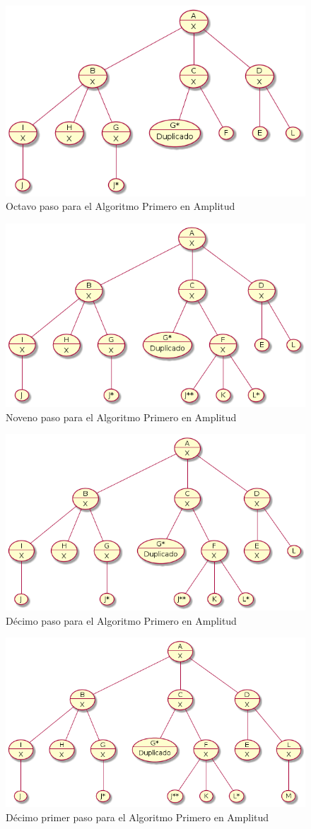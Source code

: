 \documentclass{article}
\begin{document}
\begin{figure}[H]
  \centering
  \includegraphics[width=.4\linewidth]{EJ4/ej4_007.png}
  \caption{Octavo paso para el Algoritmo Primero en Amplitud}
  \label{gr:g21}
\end{figure}

\begin{figure}[H]
  \centering
  \includegraphics[width=.4\linewidth]{EJ4/ej4_008.png}
  \caption{Noveno paso para el Algoritmo Primero en Amplitud}
  \label{gr:g22}
\end{figure}

\begin{figure}[H]
  \centering
  \includegraphics[width=.4\linewidth]{EJ4/ej4_009.png}
  \caption{D\'ecimo paso para el Algoritmo Primero en Amplitud}
  \label{gr:g23}
\end{figure}

\begin{figure}[H]
  \centering
  \includegraphics[width=.4\linewidth]{EJ4/ej4_010.png}
  \caption{D\'ecimo primer paso para el Algoritmo Primero en Amplitud}
  \label{gr:g24}
\end{figure}
\end{document}

